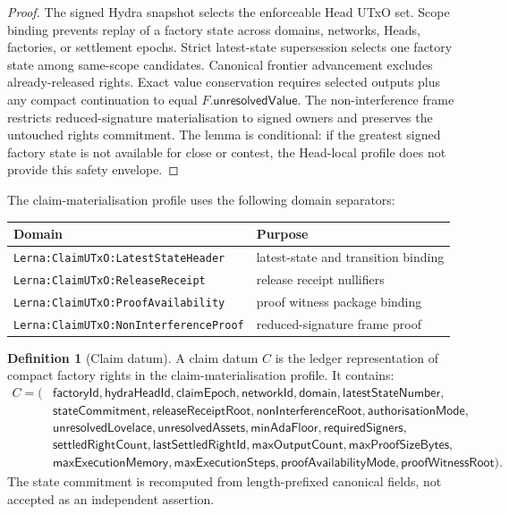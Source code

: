 \documentclass[a4paper,11pt]{article}
\theoremstyle{definition}
\newtheorem{definition}{Definition}[section]
\theoremstyle{plain}
\theoremstyle{remark}
\begin{document}
\begin{proof}
The signed Hydra snapshot selects the enforceable Head UTxO set. Scope binding
prevents replay of a factory state across domains, networks, Heads, factories,
or settlement epochs. Strict latest-state supersession selects one factory
state among same-scope candidates. Canonical frontier advancement excludes
already-released rights. Exact value conservation requires selected outputs
plus any compact continuation to equal \(F.\mathsf{unresolvedValue}\). The
non-interference frame restricts reduced-signature materialisation to signed
owners and preserves the untouched rights commitment. The lemma is conditional:
if the greatest signed factory state is not available for close or contest, the
Head-local profile does not provide this safety envelope.
\end{proof}

The claim-materialisation profile uses the following domain separators:

\begin{center}
\begin{tabular}{ll}
\toprule
\textbf{Domain} & \textbf{Purpose}\\
\midrule
\texttt{Lerna:ClaimUTxO:LatestStateHeader} & latest-state and transition binding\\
\texttt{Lerna:ClaimUTxO:ReleaseReceipt} & release receipt nullifiers\\
\texttt{Lerna:ClaimUTxO:ProofAvailability} & proof witness package binding\\
\texttt{Lerna:ClaimUTxO:NonInterferenceProof} & reduced-signature frame proof\\
\bottomrule
\end{tabular}
\end{center}

\begin{definition}[Claim datum]
\label{def:claim-datum}
A claim datum \(C\) is the ledger representation of compact factory rights in
the claim-materialisation profile. It contains:
\[
\begin{aligned}
C = (&\mathsf{factoryId},\mathsf{hydraHeadId},\mathsf{claimEpoch},
\mathsf{networkId},\mathsf{domain},\mathsf{latestStateNumber},\\
&\mathsf{stateCommitment},\mathsf{releaseReceiptRoot},
\mathsf{nonInterferenceRoot},\mathsf{authorisationMode},\\
&\mathsf{unresolvedLovelace},\mathsf{unresolvedAssets},
\mathsf{minAdaFloor},\mathsf{requiredSigners},\\
&\mathsf{settledRightCount},\mathsf{lastSettledRightId},
\mathsf{maxOutputCount},\mathsf{maxProofSizeBytes},\\
&\mathsf{maxExecutionMemory},\mathsf{maxExecutionSteps},
\mathsf{proofAvailabilityMode},\mathsf{proofWitnessRoot}).
\end{aligned}
\]
The state commitment is recomputed from length-prefixed canonical fields, not
accepted as an independent assertion.
\end{definition}
\end{document}
